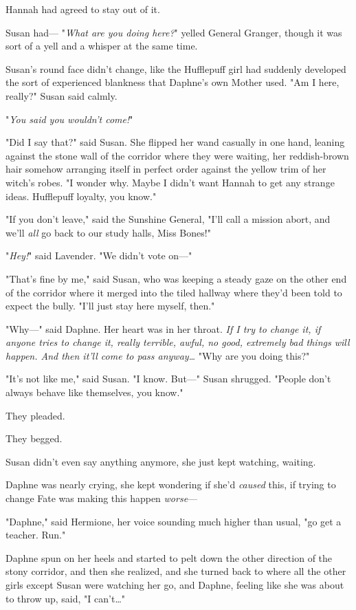 Hannah had agreed to stay out of it.

Susan had---
\sbreak
"\emph{What are you doing here?}" yelled General Granger, though it was sort of 
a yell and a whisper at the same time.

Susan's round face didn't change, like the Hufflepuff girl had suddenly 
developed the sort of experienced blankness that Daphne's own Mother used. "Am 
I here, really?" Susan said calmly.

"\emph{You said you wouldn't come!}"

"Did I say that?" said Susan. She flipped her wand casually in one hand, 
leaning against the stone wall of the corridor where they were waiting, her 
reddish-brown hair somehow arranging itself in perfect order against the yellow 
trim of her witch's robes. "I wonder why. Maybe I didn't want Hannah to get any 
strange ideas. Hufflepuff loyalty, you know."

"If you don't leave," said the Sunshine General, "I'll call a mission abort, 
and we'll \emph{all} go back to our study halls, Miss Bones!"

"\emph{Hey!}" said Lavender. "We didn't vote on---"

"That's fine by me," said Susan, who was keeping a steady gaze on the other end 
of the corridor where it merged into the tiled hallway where they'd been told 
to expect the bully. "I'll just stay here myself, then."

"Why---" said Daphne. Her heart was in her throat. \emph{If I try to change it, 
if \emph{anyone} tries to change it, really terrible, awful, no good, extremely 
bad things will happen. And then it'll come to pass anyway{\ldots}} "Why are 
you doing this?"

"It's not like me," said Susan. "I know. But---" Susan shrugged. "People don't 
always behave like themselves, you know."

They pleaded.

They begged.

Susan didn't even say anything anymore, she just kept watching, waiting.

Daphne was nearly crying, she kept wondering if she'd \emph{caused} this, if 
trying to change Fate was making this happen \emph{worse}---

"Daphne," said Hermione, her voice sounding much higher than usual, "go get a 
teacher. Run."

Daphne spun on her heels and started to pelt down the other direction of the 
stony corridor, and then she realized, and she turned back to where all the 
other girls except Susan were watching her go, and Daphne, feeling like she was 
about to throw up, said, "I can't{\ldots}"

